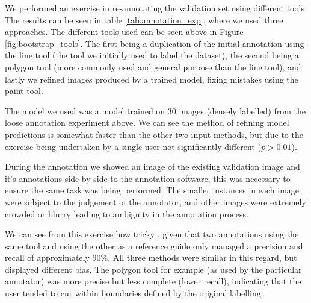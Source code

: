 We performed an exercise in re-annotating the validation set using different tools. The results can be seen in table \ref{tab:annotation_exp}, where we used three approaches. The different tools used can be seen above in Figure \ref{fig:bootstrap_tools}.  The first being a duplication of the initial annotation using the line tool (the tool we initially used to label the dataset), the second being a polygon tool (more commonly used and general purpose than the line tool), and lastly we refined images produced by a trained model, fixing mistakes using the paint tool.

The model we used was a model trained on 30 images (densely labelled) from the loose annotation experiment above. We can see the method of refining model predictions is somewhat faster than the other two input methods, but due to the exercise being undertaken by a single user not significantly different ($ p > 0.01 $).

During the annotation we showed an image of the existing validation image and it's annotations side by side to the annotation software, this was necessary to ensure the same task was being performed. The smaller instances in each image were subject to the judgement of the annotator, and other images were extremely crowded or blurry leading to ambiguity in the annotation process. 



We can see from this exercise how tricky , given that two annotations using the same tool and using the other as a reference guide only managed a precision and recall of approximately $ 90\% $. All three methods were similar in this regard, but displayed different bias. The polygon tool for example (as used by the particular annotator) was more precise but less complete (lower recall), indicating that the user tended to cut within boundaries defined by the original labelling. 





